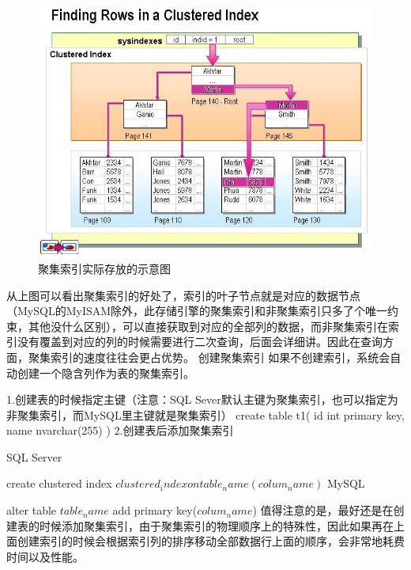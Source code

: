 \documentclass[UTF8]{ctexart}
\begin{document}
\begin{figure}[htbp]
\centering
\includegraphics[height=1\linewidth,width=1\textwidth]{Figure/index0.png}
\caption{聚集索引实际存放的示意图}
\end{figure}
从上图可以看出聚集索引的好处了，索引的叶子节点就是对应的数据节点（MySQL的MyISAM除外，此存储引擎的聚集索引和非聚集索引只多了个唯一约束，其他没什么区别），可以直接获取到对应的全部列的数据，而非聚集索引在索引没有覆盖到对应的列的时候需要进行二次查询，后面会详细讲。因此在查询方面，聚集索引的速度往往会更占优势。
创建聚集索引
如果不创建索引，系统会自动创建一个隐含列作为表的聚集索引。

1.创建表的时候指定主键（注意：SQL Sever默认主键为聚集索引，也可以指定为非聚集索引，而MySQL里主键就是聚集索引）
create table t1(
    id int primary key,
    name nvarchar(255)
)
2.创建表后添加聚集索引

SQL Server

create clustered index $clustered_index on table_name(colum_name)$
MySQL




alter table $table_name$ add primary key($colum_name$)
值得注意的是，最好还是在创建表的时候添加聚集索引，由于聚集索引的物理顺序上的特殊性，因此如果再在上面创建索引的时候会根据索引列的排序移动全部数据行上面的顺序，会非常地耗费时间以及性能。
\end{document}

